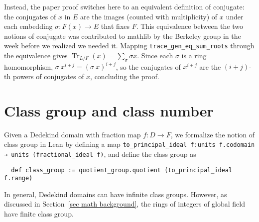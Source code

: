 \documentclass[a4paper,USenglish,cleveref, autoref, thm-restate]{lipics-v2021}
\newcommand{\lean}[1]{\texttt{#1}\xspace} %
\DeclareMathOperator{\Tr}{Tr}
\newcommand{\mathlib}{\textsf{mathlib}\xspace}
\begin{document}
Instead, the paper proof switches here to an equivalent definition of conjugate:
the conjugates of $x$ in $E$ are the images (counted with multiplicity) of $x$ under each embedding $\sigma \colon F(x) \to E$ that fixes $F$. This equivalence between the two notions of conjugate was contributed to \mathlib by the Berkeley group in the week before we realized we needed it. Mapping \lean{trace\_gen\_eq\_sum\_roots} through the equivalence gives
$\Tr_{L / F}(x) = \sum_{\sigma} \sigma x$.
Since each $\sigma$ is a ring homomorphism, $\sigma\ x^{i + j} = (\sigma\ x)^{i + j}$,
so the conjugates of $x^{i + j}$ are the $(i + j)$-th powers of conjugates of $x$, concluding the proof.

\section{Class group and class number} \label{sec:class-number}

Given a Dedekind domain with fraction map $f\colon D\to F$, we formalize the notion of class group in Lean by defining a map \lean{to\_principal\_ideal f:units f.codomain → units (fractional\_ideal f)}, %
and define the class group as
\begin{lstlisting}
  def class_group := quotient_group.quotient (to_principal_ideal f.range)
\end{lstlisting}
In general, Dedekind domains can have infinite class groups. However, as discussed in Section~\ref{sec math background}, the rings of integers of global field have finite class group.
\end{document}
